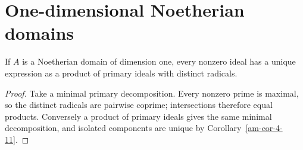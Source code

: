 \section{One-dimensional Noetherian domains}
\label{am-ch9-one-dimensional}
\begin{proposition}
\label{am-prop-9-1}
\uses{}
If $A$ is a Noetherian domain of dimension one, every nonzero ideal has a
unique expression as a product of primary ideals with distinct radicals.
\end{proposition}
\begin{proof}
Take a minimal primary decomposition.  Every nonzero prime is maximal, so the
distinct radicals are pairwise coprime; intersections therefore equal products.
Conversely a product of primary ideals gives the same minimal decomposition,
and isolated components are unique by Corollary~\ref{am-cor-4-11}.
\end{proof}

